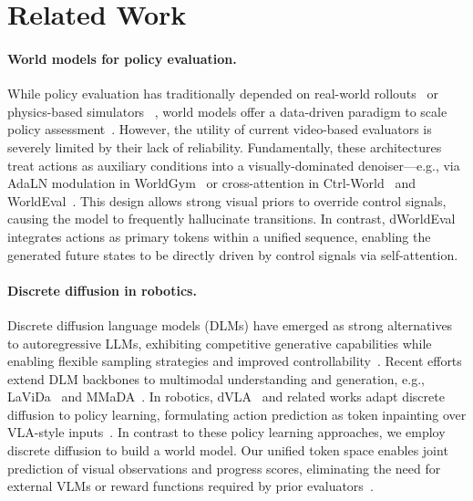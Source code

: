 \section{Related Work}
\paragraph{World models for policy evaluation.} 
While policy evaluation has traditionally depended on real-world rollouts~\cite{li24simpler, zhou2025autoeval} or physics-based simulators
~\cite{mees2022calvin, mujoco, mu2021maniskill, gu2023maniskill2, xiang2020sapien, makoviychuk2021isaac, mittal2023orbit, yu2020metaworld, mu2025robotwin, sferrazza2024humanoidbench, grotz2024peract2, liu2023libero}, world models offer a data-driven paradigm to scale policy assessment~\cite{li2025worldeval,guo2025ctrl,quevedo2506worldgym,team2025evaluating,1xWorldModel,ho20251x,huang2025enerverse,jiang2025enerverse,tseng2025scalable}. However, the utility of current video-based evaluators is severely limited by their lack of reliability. Fundamentally, these architectures treat actions as auxiliary conditions into a visually-dominated denoiser—e.g., via AdaLN modulation in WorldGym~\cite{quevedo2506worldgym} or cross-attention in Ctrl-World~\cite{guo2025ctrl} and WorldEval~\cite{li2025worldeval}. This design allows strong visual priors to override control signals, causing the model to frequently hallucinate transitions.
In contrast, dWorldEval integrates actions as primary tokens within a unified sequence, enabling the generated future states to be directly driven by control signals via self-attention.

\paragraph{Discrete diffusion in robotics.}
Discrete diffusion language models (DLMs) have emerged as strong alternatives to autoregressive LLMs, exhibiting competitive generative capabilities while enabling flexible sampling strategies and improved controllability~\cite{austin2021structured,sahoo2024simple,lou2023discrete,LLaDA}. Recent efforts extend DLM backbones to multimodal understanding and generation, e.g., LaViDa~\cite{lavida} and MMaDA~\cite{MMaDA}. In robotics, dVLA~\cite{wen2025dvla} and related works adapt discrete diffusion to policy learning, formulating action prediction as token inpainting over VLA-style inputs~\cite{wen2025dvla,liang2025discrete,wen2025LLaDA}.
In contrast to these policy learning approaches, we employ discrete diffusion to build a world model. Our unified token space enables joint prediction of visual observations and progress scores, eliminating the need for external VLMs or reward functions required by prior evaluators~\cite{li2025worldeval,quevedo2506worldgym,guo2025ctrl}.
